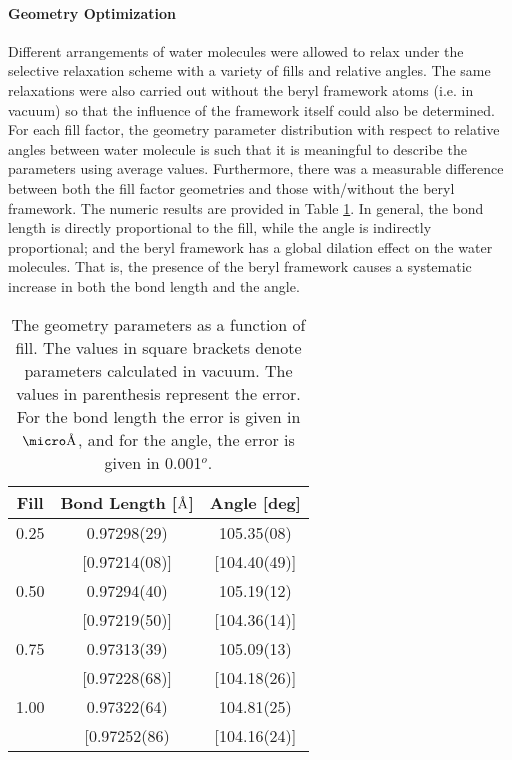 \paragraph{Geometry Optimization} Different arrangements of water molecules were allowed to relax under the selective relaxation scheme with a variety of fills and relative angles. The same relaxations were also carried out without the beryl framework atoms (i.e. in vacuum) so that the influence of the framework itself could also be determined. For each fill factor, the geometry parameter distribution with respect to relative angles between water molecule is such that it is meaningful to describe the parameters using average values. Furthermore, there was a measurable difference between both the fill factor geometries and those with/without the beryl framework. The numeric results are provided in Table \ref{tab:geo_sum}. In general, the bond length is directly proportional to the fill, while the angle is indirectly proportional; and the beryl framework has a global dilation effect on the water molecules. That is, the presence of the beryl framework causes a systematic increase in both the bond length and the angle.

\begin{table}[]
    \centering
    \begin{tabular}{c|c|c}
      Fill & Bond Length [$\text{\normalfont\AA}$] & Angle [deg] \\
      \hline
      \hline
      0.25   & 0.97298(29)    & 105.35(08) \\
             & [0.97214(08)]  & [104.40(49)] \\
     \hline
      0.50   & 0.97294(40)    & 105.19(12) \\
             & [0.97219(50)]  & [104.36(14)] \\
     \hline
      0.75   & 0.97313(39)    & 105.09(13) \\
             & [0.97228(68)]  & [104.18(26)] \\
     \hline
      1.00   & 0.97322(64)    & 104.81(25) \\
             & [0.97252(86)   & [104.16(24)]
    \end{tabular}
    \caption{The geometry parameters as a function of fill. The values in square brackets denote parameters calculated in vacuum. The values in parenthesis represent the error. For the bond length the error is given in $\micro\angstrom$, and for the angle, the error is given in 0.001$^{o}$. }
    \label{tab:geo_sum}
\end{table}

